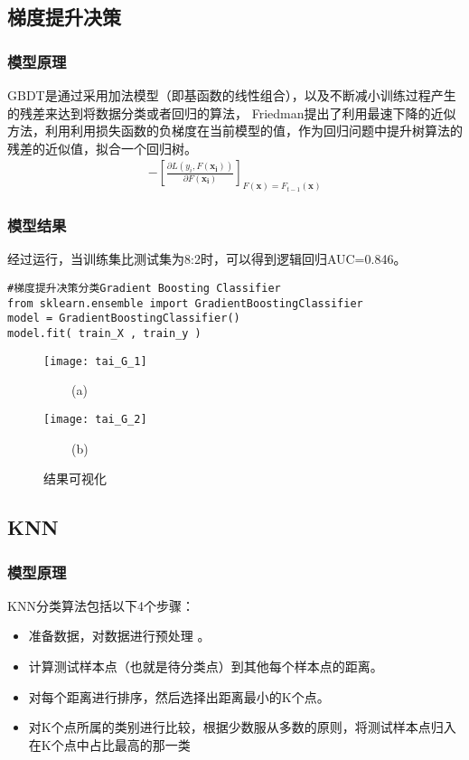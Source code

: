 \documentclass[withoutpreface,bwprint]{cumcmthesis} %
\begin{document}
\subsection{梯度提升决策}
\subsubsection{模型原理}
\par  GBDT是通过采用加法模型（即基函数的线性组合），以及不断减小训练过程产生的残差来达到将数据分类或者回归的算法， Friedman提出了利用最速下降的近似方法，利用利用损失函数的负梯度在当前模型的值，作为回归问题中提升树算法的残差的近似值，拟合一个回归树。
\begin{align}
-\left[\frac{\partial L\left(y_{i}, F\left(\mathbf{x}_{\mathbf{i}}\right)\right)}{\partial F\left(\mathbf{x}_{\mathbf{i}}\right)}\right]_{F(\mathbf{x})=F_{t-1}(\mathbf{x})}
\end{align}

\subsubsection{模型结果}
\par 经过运行，当训练集比测试集为8:2时，可以得到逻辑回归AUC=0.846。
\begin{lstlisting}
#梯度提升决策分类Gradient Boosting Classifier
from sklearn.ensemble import GradientBoostingClassifier
model = GradientBoostingClassifier()
model.fit( train_X , train_y )
\end{lstlisting}

\begin{figure}[H]
	\centering
	\begin{minipage}[t]{0.48\textwidth}
		\centering
		\texttt{[image: tai\_G\_1]}
		\centerline{$\ \ \ \ \ \ \ \ \ \ $(a)}
	\end{minipage}
	\begin{minipage}[t]{0.48\textwidth}
		\centering
		\texttt{[image: tai\_G\_2]}
		\centerline{$\ \ \ \ \ \ \ \ \ \ $(b)}
	\end{minipage}
	
	\caption{结果可视化}
\end{figure}




\subsection{KNN}
\subsubsection{模型原理}
\par KNN分类算法包括以下4个步骤：
\begin{itemize}
\item 准备数据，对数据进行预处理  。
\item 计算测试样本点（也就是待分类点）到其他每个样本点的距离。
\item 对每个距离进行排序，然后选择出距离最小的K个点。
\item 对K个点所属的类别进行比较，根据少数服从多数的原则，将测试样本点归入在K个点中占比最高的那一类
\end{itemize}
\end{document}
